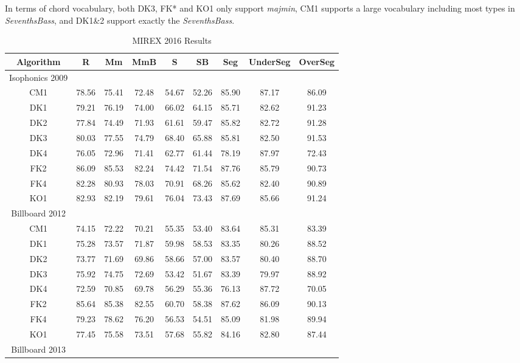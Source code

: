 In terms of chord vocabulary, both DK3, FK* and KO1 only support \textit{majmin}, CM1 supports a large vocabulary including most types in \textit{SeventhsBass}, and DK1\&2 support exactly the \textit{SeventhsBass}.
\begin{table*}[h]
\centering
\scriptsize
\caption{MIREX 2016 Results}
\label{tab:3-mirex2016}
\begin{tabular}{|c|c|c|c|c|c|c|c|c|}\hline
Algorithm & R & Mm & MmB & S & SB & Seg & UnderSeg & OverSeg \\ \hline
Isophonics 2009\\ \hline
CM1 & 78.56 & 75.41 & 72.48 & 54.67 & 52.26 & 85.90 & 87.17 & 86.09\\ \hline
DK1 & 79.21 & 76.19 & 74.00 & 66.02 & 64.15 & 85.71 & 82.62 & 91.23\\ \hline
DK2 & 77.84 & 74.49 & 71.93 & 61.61 & 59.47 & 85.82 & 82.72 & 91.28\\ \hline
DK3 & 80.03 & 77.55 & 74.79 & 68.40 & 65.88 & 85.81 & 82.50 & 91.53\\ \hline
DK4 & 76.05 & 72.96 & 71.41 & 62.77 & 61.44 & 78.19 & 87.97 & 72.43\\ \hline
FK2 & 86.09 & 85.53 & 82.24 & 74.42 & 71.54 & 87.76 & 85.79 & 90.73\\ \hline
FK4 & 82.28 & 80.93 & 78.03 & 70.91 & 68.26 & 85.62 & 82.40 & 90.89\\ \hline
KO1 & 82.93 & 82.19 & 79.61 & 76.04 & 73.43 & 87.69 & 85.66 & 91.24\\ \hline
Billboard 2012 \\ \hline
CM1 & 74.15 & 72.22 & 70.21 & 55.35 & 53.40 & 83.64 & 85.31 & 83.39\\ \hline
DK1 & 75.28 & 73.57 & 71.87 & 59.98 & 58.53 & 83.35 & 80.26 & 88.52\\ \hline
DK2 & 73.77 & 71.69 & 69.86 & 58.66 & 57.00 & 83.57 & 80.40 & 88.70\\ \hline
DK3 & 75.92 & 74.75 & 72.69 & 53.42 & 51.67 & 83.39 & 79.97 & 88.92\\ \hline
DK4 & 72.59 & 70.85 & 69.78 & 56.29 & 55.36 & 76.13 & 87.72 & 70.05\\ \hline
FK2 & 85.64 & 85.38 & 82.55 & 60.70 & 58.38 & 87.62 & 86.09 & 90.13\\ \hline
FK4 & 79.23 & 78.62 & 76.20 & 56.53 & 54.51 & 85.09 & 81.98 & 89.94\\ \hline
KO1 & 77.45 & 75.58 & 73.51 & 57.68 & 55.82 & 84.16 & 82.80 & 87.44\\ \hline
Billboard 2013 \\ \hline

\end{tabular}
\end{table*}
